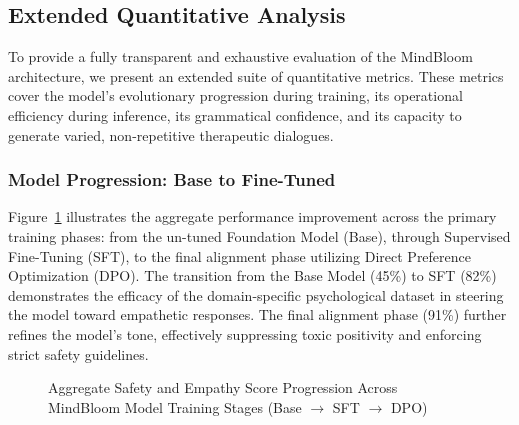 \documentclass[12pt,twoside]{article}
\begin{document}
\subsection{Extended Quantitative Analysis}

To provide a fully transparent and exhaustive evaluation of the MindBloom architecture, we present an extended suite of quantitative metrics. These metrics cover the model's evolutionary progression during training, its operational efficiency during inference, its grammatical confidence, and its capacity to generate varied, non-repetitive therapeutic dialogues.

\subsubsection{Model Progression: Base to Fine-Tuned}

Figure~\ref{fig:progression} illustrates the aggregate performance improvement across the primary training phases: from the un-tuned Foundation Model (Base), through Supervised Fine-Tuning (SFT), to the final alignment phase utilizing Direct Preference Optimization (DPO). The transition from the Base Model (45\%) to SFT (82\%) demonstrates the efficacy of the domain-specific psychological dataset in steering the model toward empathetic responses. The final alignment phase (91\%) further refines the model's tone, effectively suppressing toxic positivity and enforcing strict safety guidelines.

\begin{figure}[H]
\centering
{}
\caption{Aggregate Safety and Empathy Score Progression Across MindBloom Model Training Stages (Base $\rightarrow$ SFT $\rightarrow$ DPO)}
\label{fig:progression}
\end{figure}
\end{document}
